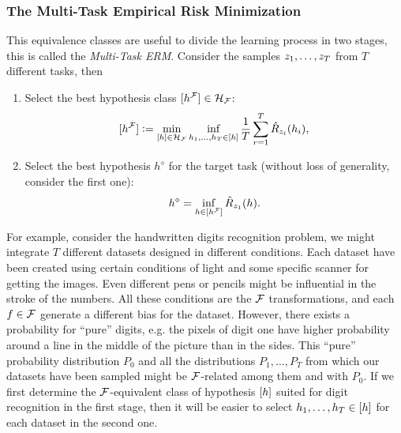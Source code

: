 \subsubsection*{The Multi-Task Empirical Risk Minimization}
This equivalence classes are useful to divide the learning process in two stages, this is called the \emph{Multi-Task ERM}. Consider the samples $z_1, \ldots, z_T$ from $T$ different tasks, then
\begin{enumerate}
    \item Select the best hypothesis class $\lbrack h^{\mathcal{F}}\rbrack \in \mathcal{H}_{\mathcal{F}}$:
    \begin{equation}
        \nonumber
        \lbrack h^{\mathcal{F}}\rbrack \vcentcolon= \min_{\lbrack h\rbrack \in \mathcal{H}_{\mathcal{F}}} \inf_{h_1, \ldots, h_T \in \lbrack h\rbrack} \frac{1}{T} \sum_{r=1}^T \hat{R}_{z_i}(h_i) ,
    \end{equation}
    \item Select the best hypothesis $h^\diamond$ for the target task (without loss of generality, consider the first one):
    \begin{equation}
        \nonumber
        h^\diamond = \inf_{h \in \lbrack h^{\mathcal{F}}\rbrack} \hat{R}_{z_1}(h) .
    \end{equation}
\end{enumerate}

For example, consider the handwritten digits recognition problem, we might integrate $T$ different datasets designed in different conditions. Each dataset have been created using certain conditions of light and some specific scanner for getting the images. Even different pens or pencils might be influential in the stroke of the numbers. All these conditions are the $\mathcal{F}$ transformations, and each $f \in \mathcal{F}$ generate a different bias for the dataset. However, there exists a probability for ``pure'' digits, e.g. the pixels of digit one have higher probability around a line in the middle of the picture than in the sides. This ``pure'' probability distribution $P_0$ and all the distributions $P_1, \ldots, P_T$ from which our datasets have been sampled might be $\mathcal{F}$-related among them and with $P_0$. If we first determine the $\mathcal{F}$-equivalent class of hypothesis $\lbrack h\rbrack$ suited for digit recognition in the first stage, then it will be easier to select $h_1, \ldots, h_T \in \lbrack h\rbrack$ for each dataset in the second one.


